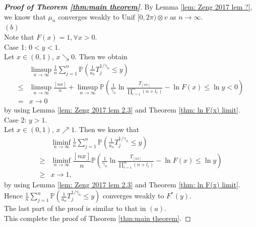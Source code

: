 \documentclass[12pt]{article}
\theoremstyle{plain}
\theoremstyle{definition}
\theoremstyle{remark}
\begin{document}
\begin{proof}[\textit{\textbf{Proof of Theorem \ref{thm:main theorem}}}]
By Lemma \ref{lem: Zeng 2017   lem ?}, we know that $\mu_{n}$ converges weakly to$\text { Unif }[0,2 \pi) \otimes v$ as $n\to \infty$.\\
$(b)$\\
Note that $F(x)=1,\forall x>0$.\\
Case 1: $0<y<1$.\\
Let $x\in (0,1)$, $x\searrow0$. Then we obtain
\begin{equation*}
\begin{aligned} & \limsup _{n \rightarrow \infty} \frac{1}{n} \sum_{j=1}^{n} \mathbb{P}\left(\frac{1}{a_{n}} T_{j}^{1 / \gamma_{n}} \leqslant y\right) \\ \leqslant & \limsup _{n \rightarrow \infty} \frac{[n x]}{n}+\limsup _{n \rightarrow \infty} \mathbb{P}\left(\frac{1}{\gamma_{n}} \ln \frac{T_{[n x]}}{\prod_{r=1}^{m}\left(n+l_{r}\right)}-\ln F(x) \leqslant \ln y<0\right) \\
=&x\to 0
 \end{aligned}
\end{equation*}
by using Lemma \ref{lem: Zeng 2017   lem 2.3} and Theorem \ref{thm: ln F(x) limit}.\\
Case 2: $y>1$.\\
Let $x\in (0,1)$, $x\nearrow 1$. Then we know that
\begin{equation*}
    \begin{aligned}
        & \liminf _{n \rightarrow \infty} \frac{1}{n} \sum_{j=1}^{n} \mathbb{P}\left(\frac{1}{a_{n}} T_{j}^{1 / \gamma_{n}} \leqslant y\right) \\
    \geq& \liminf _{n \rightarrow \infty}\dfrac{[nx]}{n} \mathbb{P}\left(\frac{1}{\gamma_{n}} \ln \frac{T_{[n x]}}{\prod_{r=1}^{m}\left(n+l_{r}\right)}-\ln F(x) \leqslant \ln y\right)
    \\  \geqslant
        &x\to 1,
    \end{aligned}
\end{equation*}
by using Lemma \ref{lem: Zeng 2017   lem 2.3} and Theorem \ref{thm: ln F(x) limit}.\\
Hence $\frac{1}{n} \sum_{j=1}^{n} \mathbb{P}\left(\frac{1}{a_{n}} T_{j}^{1 / \gamma_{n}} \leq y\right)$ converges weakly to $F^*(y)$.\\
The last part of the proof is similar to that in $(a)$. \\
This complete the proof of Theorem \ref{thm:main theorem}.
\end{proof}
\end{document}
